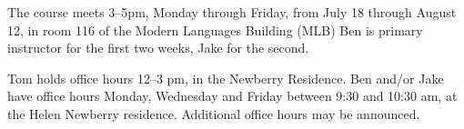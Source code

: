 The course meets 3--5pm, Monday through Friday, from  July 18 through August
12,  in room 116 of the Modern Languages Building (MLB) Ben is primary
instructor for the first two weeks, Jake for the second.

Tom holds office hours 12--3 pm, in the Newberry Residence. Ben and/or Jake
have office hours Monday, Wednesday and Friday between 9:30 and 10:30 am, at
the Helen Newberry residence.  Additional office hours may be announced.
